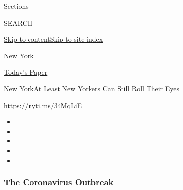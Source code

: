 Sections

SEARCH

\protect\hyperlink{site-content}{Skip to
content}\protect\hyperlink{site-index}{Skip to site index}

\href{https://www.nytimes3xbfgragh.onion/section/nyregion}{New York}

\href{https://myaccount.nytimes3xbfgragh.onion/auth/login?response_type=cookie\&client_id=vi}{}

\href{https://www.nytimes3xbfgragh.onion/section/todayspaper}{Today's
Paper}

\href{/section/nyregion}{New York}\textbar{}At Least New Yorkers Can
Still Roll Their Eyes

\url{https://nyti.ms/34MqLiE}

\begin{itemize}
\item
\item
\item
\item
\item
\end{itemize}

\hypertarget{the-coronavirus-outbreak}{%
\subsubsection{\texorpdfstring{\href{https://www.nytimes3xbfgragh.onion/news-event/coronavirus?name=styln-coronavirus-national\&region=TOP_BANNER\&block=storyline_menu_recirc\&action=click\&pgtype=Article\&impression_id=375580b0-f4c0-11ea-ab40-e781aaaeae39\&variant=undefined}{The
Coronavirus
Outbreak}}{The Coronavirus Outbreak}}\label{the-coronavirus-outbreak}}

